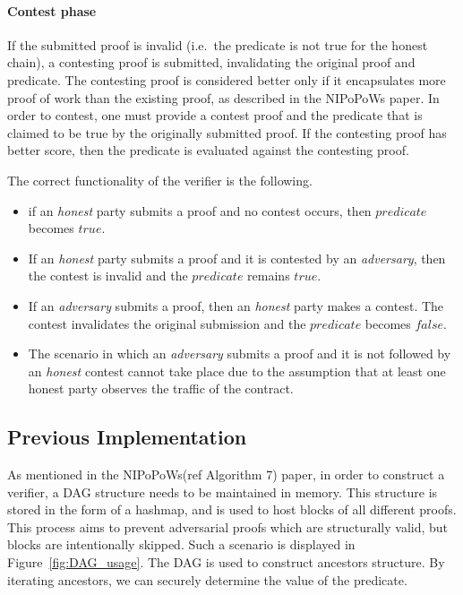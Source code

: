 \paragraph{Contest phase} If the submitted proof is invalid (i.e.\ the
predicate is not true for the honest chain), a contesting proof is
submitted, invalidating the original proof and predicate. The
contesting proof is considered better only if it encapsulates more
proof of work than the existing proof, as described in the NIPoPoWs
paper. In order to contest, one must provide a contest proof and the predicate
that is claimed to be true by the originally submitted proof. If the contesting
proof has better score, then the predicate is evaluated against the contesting
proof.

The correct functionality of the verifier is the following.
\begin{itemize}
    \item
        if an \textit{honest} party submits a proof and no contest occurs, then
        $predicate$ becomes $true$.
    \item
        If an \textit{honest} party submits a proof and it is contested by an
        \textit{adversary}, then the contest is invalid and the $predicate$
        remains $true$.
    \item
        If an \textit{adversary} submits a proof, then an \textit{honest} party
        makes a contest. The contest invalidates the original submission and
        the $predicate$ becomes $false$.
    \item
        The scenario in which an \textit{adversary} submits a proof and it is not
        followed by an \textit{honest} contest cannot take place due to the assumption
        that at least one honest party observes the traffic of the contract.
\end{itemize}

\subsection{Previous Implementation}
As mentioned in the NIPoPoWs(ref Algorithm 7) paper, in order to construct a
verifier, a DAG structure needs to be maintained in memory. This structure is
stored in the form of a hashmap, and is used to host blocks of all different
proofs. This process aims to prevent adversarial proofs which are structurally
valid, but blocks are intentionally skipped. Such a scenario is displayed in
Figure~\ref{fig:DAG_usage}. The DAG is used to construct ancestors structure.
By iterating ancestors, we can securely determine the value of the predicate.

